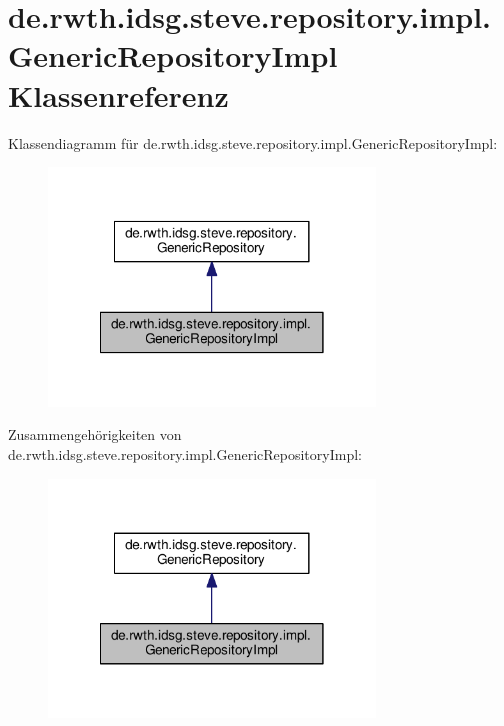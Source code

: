 \hypertarget{classde_1_1rwth_1_1idsg_1_1steve_1_1repository_1_1impl_1_1_generic_repository_impl}{\section{de.\-rwth.\-idsg.\-steve.\-repository.\-impl.\-Generic\-Repository\-Impl Klassenreferenz}
\label{classde_1_1rwth_1_1idsg_1_1steve_1_1repository_1_1impl_1_1_generic_repository_impl}
}


Klassendiagramm für de.\-rwth.\-idsg.\-steve.\-repository.\-impl.\-Generic\-Repository\-Impl\-:\nopagebreak
\begin{figure}[H]
\begin{center}
\leavevmode
\includegraphics[width=246pt]{classde_1_1rwth_1_1idsg_1_1steve_1_1repository_1_1impl_1_1_generic_repository_impl__inherit__graph}
\end{center}
\end{figure}


Zusammengehörigkeiten von de.\-rwth.\-idsg.\-steve.\-repository.\-impl.\-Generic\-Repository\-Impl\-:\nopagebreak
\begin{figure}[H]
\begin{center}
\leavevmode
\includegraphics[width=246pt]{classde_1_1rwth_1_1idsg_1_1steve_1_1repository_1_1impl_1_1_generic_repository_impl__coll__graph}
\end{center}
\end{figure}
